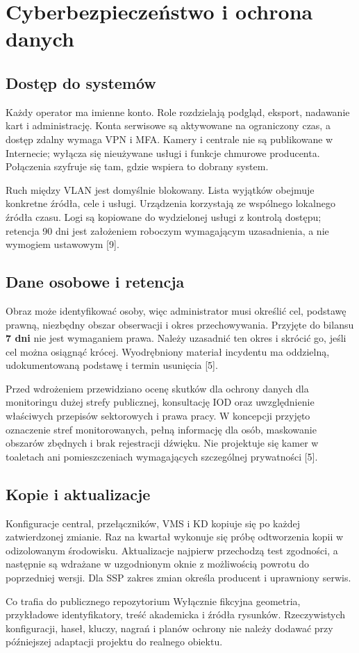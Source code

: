 \section{Cyberbezpieczeństwo i ochrona danych}
\subsection*{Dostęp do systemów}
Każdy operator ma imienne konto. Role rozdzielają podgląd, eksport, nadawanie kart i administrację. Konta serwisowe są aktywowane na ograniczony czas, a dostęp zdalny wymaga VPN i MFA. Kamery i centrale nie są publikowane w Internecie; wyłącza się nieużywane usługi i funkcje chmurowe producenta. Połączenia szyfruje się tam, gdzie wspiera to dobrany system.

Ruch między VLAN jest domyślnie blokowany. Lista wyjątków obejmuje konkretne źródła, cele i usługi. Urządzenia korzystają ze wspólnego lokalnego źródła czasu. Logi są kopiowane do wydzielonej usługi z kontrolą dostępu; retencja 90 dni jest założeniem roboczym wymagającym uzasadnienia, a nie wymogiem ustawowym [9].

\subsection*{Dane osobowe i retencja}
Obraz może identyfikować osoby, więc administrator musi określić cel, podstawę prawną, niezbędny obszar obserwacji i okres przechowywania. Przyjęte do bilansu \textbf{7 dni} nie jest wymaganiem prawa. Należy uzasadnić ten okres i skrócić go, jeśli cel można osiągnąć krócej. Wyodrębniony materiał incydentu ma oddzielną, udokumentowaną podstawę i termin usunięcia [5].

Przed wdrożeniem przewidziano ocenę skutków dla ochrony danych dla monitoringu dużej strefy publicznej, konsultację IOD oraz uwzględnienie właściwych przepisów sektorowych i prawa pracy. W koncepcji przyjęto oznaczenie stref monitorowanych, pełną informację dla osób, maskowanie obszarów zbędnych i brak rejestracji dźwięku. Nie projektuje się kamer w toaletach ani pomieszczeniach wymagających szczególnej prywatności [5].

\subsection*{Kopie i aktualizacje}
Konfiguracje central, przełączników, VMS i KD kopiuje się po każdej zatwierdzonej zmianie. Raz na kwartał wykonuje się próbę odtworzenia kopii w odizolowanym środowisku. Aktualizacje najpierw przechodzą test zgodności, a następnie są wdrażane w uzgodnionym oknie z możliwością powrotu do poprzedniej wersji. Dla SSP zakres zmian określa producent i uprawniony serwis.

\begin{note}{Co trafia do publicznego repozytorium}
Wyłącznie fikcyjna geometria, przykładowe identyfikatory, treść akademicka i źródła rysunków. Rzeczywistych konfiguracji, haseł, kluczy, nagrań i planów ochrony nie należy dodawać przy późniejszej adaptacji projektu do realnego obiektu.
\end{note}
